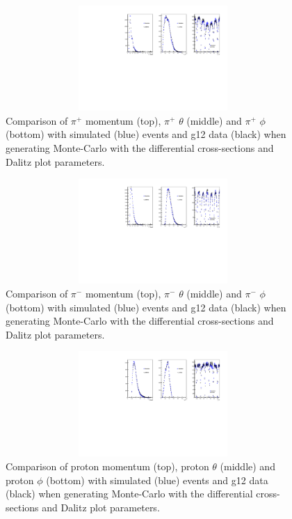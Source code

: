 \documentclass[12pt,a4paper]{amsbook}
\theoremstyle{definition}
\begin{document}
\begin{figure}[ht!]
\centerline{
\includegraphics[width=14cm,height=4cm]{Pip.pdf}}
\caption{Comparison of  $\pi^{+}$ momentum (top), $\pi^{+}$ $\theta$ (middle) and $\pi^{+}$ $\phi$ (bottom) with simulated (blue) events and g12 data (black) when generating Monte-Carlo with the differential cross-sections and Dalitz plot parameters.}
\label{fig7}
\end{figure}
 
\begin{figure}[ht!]
\centerline{
\includegraphics[width=14cm,height=4cm]{Pim.pdf}}
\caption{Comparison of $\pi^{-}$ momentum (top), $\pi^{-}$ $\theta$ (middle) and $\pi^{-}$ $\phi$ (bottom) with simulated (blue) events and g12 data (black) when generating Monte-Carlo with the differential cross-sections and Dalitz plot parameters.}
\label{fig8}
\end{figure}

\begin{figure}[ht!]
\centerline{
\includegraphics[width=14cm,height=4cm]{P.pdf}}
\caption{Comparison of proton momentum (top), proton $\theta$ (middle) and proton $\phi$ (bottom) with simulated (blue) events and g12 data (black) when generating Monte-Carlo with the differential cross-sections and Dalitz plot parameters.}
\label{fig9}
\end{figure}
 
\end{document}
